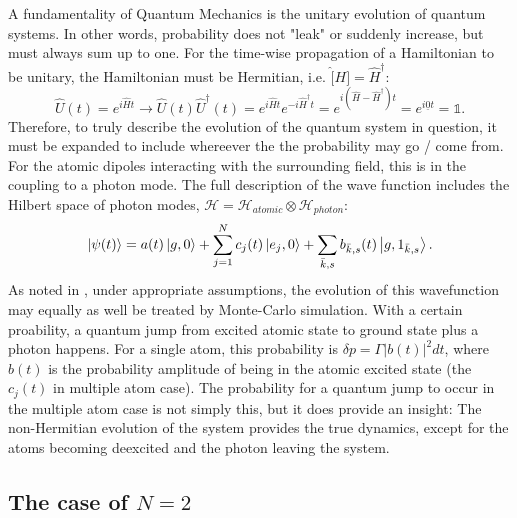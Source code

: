 \documentclass{article}
\begin{document}
A fundamentality of Quantum Mechanics is the unitary evolution of quantum systems. In other words, probability does not "leak" or suddenly increase, but must always sum up to one. For the time-wise propagation of a Hamiltonian to be unitary, the Hamiltonian must be Hermitian, i.e. $\hat[H] = \hat{H}^\dagger$:
\begin{equation}\label{eq:unitarity}
    \hat{U}(t) = e^{i \hat{H} t} \rightarrow \hat{U}(t) \hat{U}^\dagger(t) = e^{i \hat{H} t} e^{-i \hat{H}^\dagger t} = e^{i(\hat{H}-\hat{H}^\dagger) t} = e^{i \underline{0} t} = \mathds{1}.
\end{equation}
Therefore, to truly describe the evolution of the quantum system in question, it must be expanded to include whereever the the probability may go / come from. For the atomic dipoles interacting with the surrounding field, this is in the coupling to a photon mode. The full description of the wave function includes the Hilbert space of photon modes, $\mathscr{H} = \mathscr{H}_{atomic} \otimes \mathscr{H}_{photon}$:
\begin{equation}\label{eq:full_wave_function}
    \ket{\psi(t)} = a(t) \ket{g, 0} + \sum_{j=1}^N c_j(t) \ket{e_j, 0} + \sum_{\bar{k},s} b_{\bar{k},s} (t) \ket{g, 1_{\bar{k},s}}.
\end{equation}
As noted in \cite{MolmerCastin}, under appropriate assumptions, the evolution of this wavefunction may equally as well be treated by Monte-Carlo simulation. With a certain proability, a quantum jump from excited atomic state to ground state plus a photon happens. For a single atom, this probability is $\delta p = \Gamma |b(t)|^2 dt$, where $b(t)$ is the probability amplitude of being in the atomic excited state (the $c_j (t)$ in multiple atom case). The probability for a quantum jump to occur in the multiple atom case is not simply this, but it does provide an insight: The non-Hermitian evolution of the system provides the true dynamics, except for the atoms becoming deexcited and the photon leaving the system. 

\subsection{The case of $N=2$}\label{sec:N2}
\end{document}
